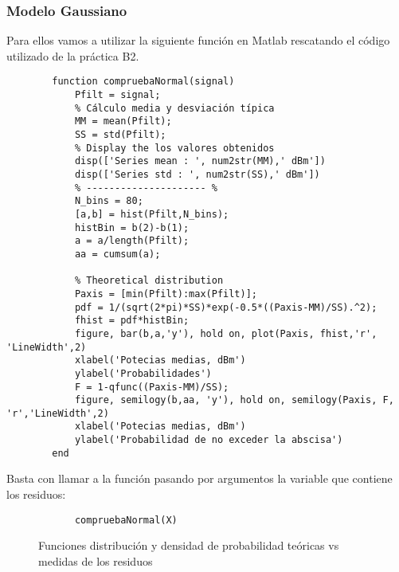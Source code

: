 \documentclass{article}
\begin{document}
    \subsubsection{Modelo Gaussiano}
        \par Para ellos vamos a utilizar la siguiente función en Matlab rescatando el código utilizado de la práctica B2.
        \begin{lstlisting}
        function compruebaNormal(signal)
            Pfilt = signal;
            % Cálculo media y desviación típica
            MM = mean(Pfilt);
            SS = std(Pfilt);
            % Display the los valores obtenidos
            disp(['Series mean : ', num2str(MM),' dBm'])
            disp(['Series std : ', num2str(SS),' dBm'])
            % --------------------- %
            N_bins = 80;
            [a,b] = hist(Pfilt,N_bins);
            histBin = b(2)-b(1);
            a = a/length(Pfilt);
            aa = cumsum(a);
           
            % Theoretical distribution
            Paxis = [min(Pfilt):max(Pfilt)];
            pdf = 1/(sqrt(2*pi)*SS)*exp(-0.5*((Paxis-MM)/SS).^2);
            fhist = pdf*histBin;
            figure, bar(b,a,'y'), hold on, plot(Paxis, fhist,'r', 'LineWidth',2)
            xlabel('Potecias medias, dBm')
            ylabel('Probabilidades')
            F = 1-qfunc((Paxis-MM)/SS);
            figure, semilogy(b,aa, 'y'), hold on, semilogy(Paxis, F, 'r','LineWidth',2)
            xlabel('Potecias medias, dBm')
            ylabel('Probabilidad de no exceder la abscisa')
        end
        \end{lstlisting}
        \par Basta con llamar a la función pasando por argumentos la variable que contiene los residuos: 
        \begin{lstlisting}
            compruebaNormal(X)
        \end{lstlisting}
        \begin{figure}[h]
            \centering
            \begin{subfigure}
                  \texttt{[image: figures\_outputs/B3/pdf.eps]} 
            \end{subfigure}
            \begin{subfigure}
                   \texttt{[image: figures\_outputs/B3/FD.eps]}
            \end{subfigure}
            \caption{Funciones distribución y densidad de probabilidad teóricas vs medidas de los residuos}
            \label{fig:my_label}
        \end{figure}
\end{document}
